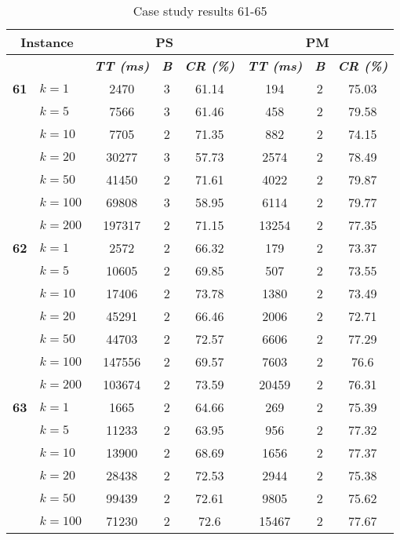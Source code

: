     \begin{table}[htbp]
    \caption{Case study results 61-65}
    \centering
    \begin{tabular}{|l|l|c|c|c|c|c|c|}
    \hline
    \multicolumn{ 2}{|c|}{\textbf{Instance}} & \multicolumn{ 3}{c|}{\textbf{PS}} & \multicolumn{ 3}{c|}{\textbf{PM}} \\ \hline
    \multicolumn{ 2}{|l|}{} & \textbf{\textit{TT (ms)}} & \textbf{\textit{B}} & \textbf{\textit{CR (\%)}} & \textbf{\textit{TT (ms)}} & \textbf{\textit{B}} & \textbf{\textit{CR (\%)}} \\ \hline
    \multicolumn{1}{|r|}{\textbf{61}} & $k=1$ & 2470 & 3 & 61.14 & 194 & 2 & 75.03 \\ 
     & $k=5$ & 7566 & 3 & 61.46 & 458 & 2 & 79.58 \\ 
     & $k=10$ & 7705 & 2 & 71.35 & 882 & 2 & 74.15 \\ 
     & $k=20$ & 30277 & 3 & 57.73 & 2574 & 2 & 78.49 \\ 
     & $k=50$ & 41450 & 2 & 71.61 & 4022 & 2 & 79.87 \\ 
     & $k=100$ & 69808 & 3 & 58.95 & 6114 & 2 & 79.77 \\ 
     & $k=200$ & 197317 & 2 & 71.15 & 13254 & 2 & 77.35 \\ \hline
    \multicolumn{1}{|r|}{\textbf{62}} & $k=1$ & 2572 & 2 & 66.32 & 179 & 2 & 73.37 \\ 
     & $k=5$ & 10605 & 2 & 69.85 & 507 & 2 & 73.55 \\ 
     & $k=10$ & 17406 & 2 & 73.78 & 1380 & 2 & 73.49 \\ 
     & $k=20$ & 45291 & 2 & 66.46 & 2006 & 2 & 72.71 \\ 
     & $k=50$ & 44703 & 2 & 72.57 & 6606 & 2 & 77.29 \\ 
     & $k=100$ & 147556 & 2 & 69.57 & 7603 & 2 & 76.6 \\ 
     & $k=200$ & 103674 & 2 & 73.59 & 20459 & 2 & 76.31 \\ \hline
    \multicolumn{1}{|r|}{\textbf{63}} & $k=1$ & 1665 & 2 & 64.66 & 269 & 2 & 75.39 \\ 
     & $k=5$ & 11233 & 2 & 63.95 & 956 & 2 & 77.32 \\ 
     & $k=10$ & 13900 & 2 & 68.69 & 1656 & 2 & 77.37 \\ 
     & $k=20$ & 28438 & 2 & 72.53 & 2944 & 2 & 75.38 \\ 
     & $k=50$ & 99439 & 2 & 72.61 & 9805 & 2 & 75.62 \\ 
     & $k=100$ & 71230 & 2 & 72.6 & 15467 & 2 & 77.67 \\ 

\end{tabular}
\end{table}

